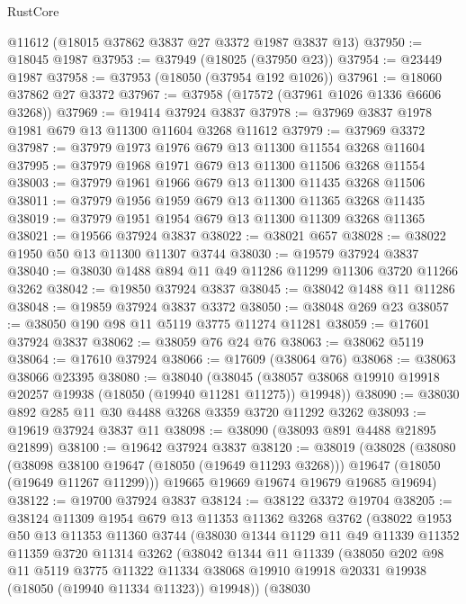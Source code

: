 \begin{lexlean}{RustCore}
\begin{coremodule}
    @11612
    (@18015 @37862 @3837 @27 @3372 @1987 @3837 @13)
@37950 := @18045 @1987
@37953 := @37949 (@18025 (@37950 @23))
@37954 := @23449 @1987
@37958 := @37953 (@18050 (@37954 @192 @1026))
@37961 := @18060 @37862 @27 @3372
@37967 := @37958 (@17572 (@37961 @1026 @1336 @6606 @3268))
@37969 := @19414 @37924 @3837
@37978 := @37969 @3837 @1978 @1981 @679 @13 @11300 @11604 @3268 @11612
@37979 := @37969 @3372
@37987 := @37979 @1973 @1976 @679 @13 @11300 @11554 @3268 @11604
@37995 := @37979 @1968 @1971 @679 @13 @11300 @11506 @3268 @11554
@38003 := @37979 @1961 @1966 @679 @13 @11300 @11435 @3268 @11506
@38011 := @37979 @1956 @1959 @679 @13 @11300 @11365 @3268 @11435
@38019 := @37979 @1951 @1954 @679 @13 @11300 @11309 @3268 @11365
@38021 := @19566 @37924 @3837
@38022 := @38021 @657
@38028 := @38022 @1950 @50 @13 @11300 @11307 @3744
@38030 := @19579 @37924 @3837
@38040 := @38030 @1488 @894 @11 @49 @11286 @11299 @11306 @3720 @11266 @3262
@38042 := @19850 @37924 @3837
@38045 := @38042 @1488 @11 @11286
@38048 := @19859 @37924 @3837 @3372
@38050 := @38048 @269 @23
@38057 := @38050 @190 @98 @11 @5119 @3775 @11274 @11281
@38059 := @17601 @37924 @3837
@38062 := @38059 @76 @24 @76
@38063 := @38062 @5119
@38064 := @17610 @37924
@38066 := @17609 (@38064 @76)
@38068 := @38063 @38066 @23395
@38080 := @38040
    (@38045 (@38057 @38068 @19910 @19918 @20257 @19938 (@18050 (@19940 @11281 @11275)) @19948))
@38090 := @38030 @892 @285 @11 @30 @4488 @3268 @3359 @3720 @11292 @3262
@38093 := @19619 @37924 @3837 @11
@38098 := @38090 (@38093 @891 @4488 @21895 @21899)
@38100 := @19642 @37924 @3837
@38120 := @38019
    (@38028
      (@38080
        (@38098 @38100 @19647 (@18050 (@19649 @11293 @3268)))
        @19647
        (@18050 (@19649 @11267 @11299)))
      @19665
      @19669
      @19674
      @19679
      @19685
      @19694)
@38122 := @19700 @37924 @3837
@38124 := @38122 @3372 @19704
@38205 := @38124
    @11309
    @1954
    @679
    @13
    @11353
    @11362
    @3268
    @3762
    (@38022
      @1953
      @50
      @13
      @11353
      @11360
      @3744
      (@38030
        @1344
        @1129
        @11
        @49
        @11339
        @11352
        @11359
        @3720
        @11314
        @3262
        (@38042
          @1344
          @11
          @11339
          (@38050
            @202
            @98
            @11
            @5119
            @3775
            @11322
            @11334
            @38068
            @19910
            @19918
            @20331
            @19938
            (@18050 (@19940 @11334 @11323))
            @19948))
        (@38030

\end{coremodule}
\end{lexlean}
